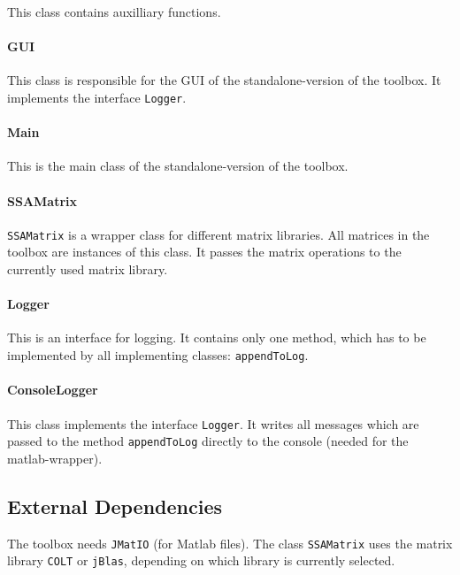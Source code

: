 \documentclass{article}
\newcommand{\1}{\ensuremath{\mathds{1}}}
\newcommand{\0}{\ensuremath{0}}
\begin{document}
This class contains auxilliary functions.

\paragraph{GUI}

This class is responsible for the GUI of the standalone-version of the toolbox. It implements the interface \texttt{Logger}.

\paragraph{Main}

This is the main class of the standalone-version of the toolbox.

\paragraph{SSAMatrix}

\texttt{SSAMatrix} is a wrapper class for different matrix libraries. All matrices in the toolbox are instances of this class. It passes the
matrix operations to the currently used matrix library.

\paragraph{Logger}

This is an interface for logging. It contains only one method, which has to be implemented by all implementing classes: \texttt{appendToLog}.

\paragraph{ConsoleLogger}

This class implements the interface \texttt{Logger}. It writes all messages which are passed to the method
\texttt{appendToLog} directly to the console (needed for the matlab-wrapper).

\subsection*{External Dependencies}

The toolbox needs \texttt{JMatIO} (for Matlab files). The class \texttt{SSAMatrix} uses the matrix library \texttt{COLT} or \texttt{jBlas}, depending on which library
is currently selected.

\end{document}
